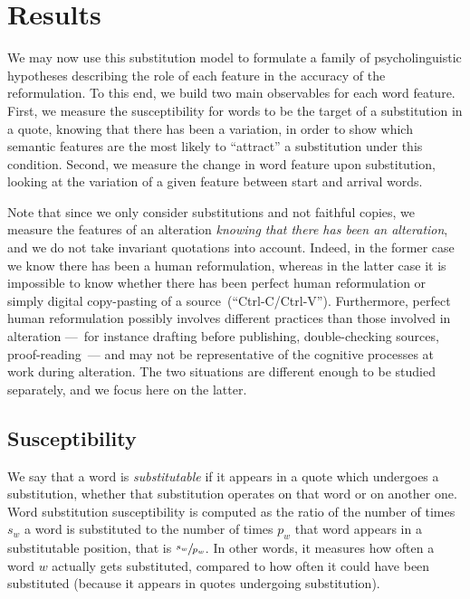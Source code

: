\section{Results}\label{sec:results}


We may now use this substitution model to formulate a family of psycholinguistic hypotheses describing the role of each feature in the accuracy of the reformulation.  To this end, we build two main observables for each word feature.
First, we measure the susceptibility for words to be the target of a substitution in a quote, knowing that there has been a variation, in order to show which semantic features are the most likely to ``attract'' a substitution under this condition. Second, we measure the change in word feature upon substitution, looking at the variation of a given feature between start and arrival words.

Note that since we only consider substitutions and not faithful copies, we measure the features of an alteration \emph{knowing that there has been an alteration}, and we do not take invariant quotations into account.
Indeed, in the former case we know there has been a human reformulation, whereas in the latter case it is impossible to know whether there has been perfect human reformulation or simply digital copy-pasting of a source~(``{\sc Ctrl-C}/{\sc Ctrl-V}'').
Furthermore, perfect human reformulation possibly involves different practices than those involved in alteration ---~for instance drafting before publishing, double-checking sources, proof-reading~--- and may not be representative of the cognitive processes at work during alteration.
The two situations are different enough to be studied separately, and we focus here on the latter.

\subsection{Susceptibility}


We say that a word is \emph{substitutable} if it appears in a quote which undergoes a substitution, whether that substitution operates on that word or on another one.
Word substitution susceptibility is computed as the ratio of the number of times $s_w$ a word is substituted to the number of times $p_w$ that word appears in a substitutable position, that is $\sfrac{s_w}{p_w}$. {In other words, it measures how often a word $w$ actually gets substituted, compared to how often it could have been substituted (because it appears in quotes undergoing substitution)}.


